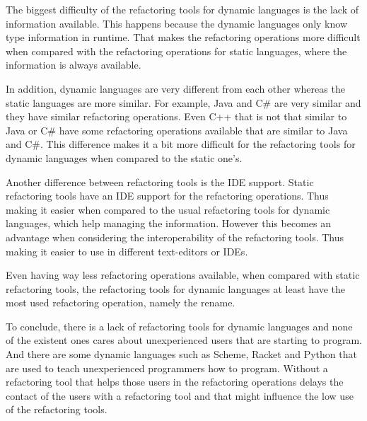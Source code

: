 The biggest difficulty of the refactoring tools for dynamic languages is the lack of information available. 
This happens because the dynamic languages only know type information in runtime. 
That makes the refactoring operations more difficult when compared with the refactoring operations for static languages, where the information is always available.

In addition, dynamic languages are very different from each other whereas the static languages are more similar.
For example, Java and C\# are very similar and they have similar refactoring operations.
Even C++ that is not that similar to Java or C\# have some refactoring operations available that are similar to Java and C\#. 
This difference makes it a bit more difficult for the refactoring tools for dynamic languages when compared to the static one's. %

Another difference between refactoring tools is the IDE support. 
Static refactoring tools have an IDE support for the refactoring operations. 
Thus making it easier when compared to the usual refactoring tools for dynamic languages, which help managing the information. 
However this becomes an advantage when considering the interoperability of the refactoring tools. 
Thus making it easier to use in different text-editors or IDEs.

Even having way less refactoring operations available, when compared with static refactoring tools, the refactoring tools for dynamic languages at least have the most used refactoring operation, namely the rename.









To conclude, there is a lack of refactoring tools for dynamic languages and none of the existent ones cares about unexperienced users that are starting to program. 
And there are some dynamic languages such as Scheme, Racket and Python that are used to teach unexperienced programmers how to program.
Without a refactoring tool that helps those users in the refactoring operations delays the contact of the users with a refactoring tool and that might influence the low use of the refactoring tools.

